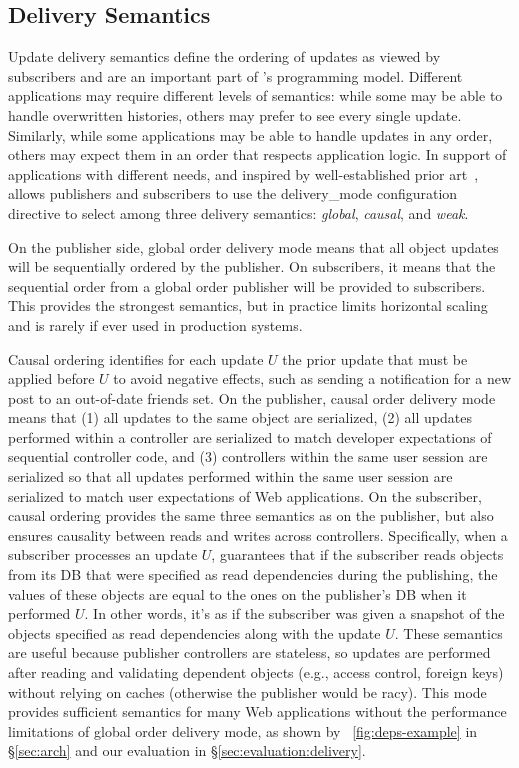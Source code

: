 \subsection{\synapse Delivery Semantics}
\label{sec:semantics}
Update delivery semantics define the ordering of updates as viewed by subscribers and are an important part of \synapse's
programming model. Different applications may 
require different levels of semantics:  while some may be able to handle overwritten histories,
others may prefer to see every single update.  Similarly, while some
applications may be able to  handle updates in any order, others may expect them in an
order that respects application logic. In support of applications with
different needs, and inspired by well-established prior
art~\cite{Birman:1991:LCA:128738.128742}, \synapse allows
publishers and subscribers to use the {\code delivery\_mode} configuration directive
to select among three delivery semantics: {\em global}, {\em causal},
and {\em weak}. 

On the publisher side, global order delivery mode means that all object
updates will be sequentially ordered by the publisher.  On
subscribers, it means that the sequential order from a global order
publisher will be provided to subscribers.  This provides the
strongest semantics, but in practice limits horizontal scaling and is
rarely if ever used in production systems.  

Causal ordering identifies for each update $U$ the prior update that
must be applied before $U$ to avoid negative effects, such as sending a
notification for a new post to an out-of-date friends set.
On the publisher, causal order delivery mode means that (1) all 
updates to the same object are serialized, (2) all updates performed
within a controller are serialized to match developer expectations of
sequential controller code, and (3) controllers within the same
user session are serialized so that all updates performed within the
same user session are serialized to match user expectations of Web
applications.
On the subscriber, causal ordering provides the same three semantics as on the
publisher, but also ensures causality between
reads and writes across controllers. 
Specifically, when a subscriber processes an update $U$, \synapse guarantees
that if the subscriber reads objects from its DB that were specified as read dependencies
during the publishing, the values of these objects are equal
to the ones on the publisher's DB when it performed $U$.
In other words, it's as if the subscriber was given a snapshot of the objects
specified as read dependencies along with the update $U$.
These semantics are useful because publisher controllers are stateless, so
updates are performed after reading and validating dependent objects (e.g.,
access control, foreign keys) without relying on caches (otherwise the publisher
would be racy).
This mode provides sufficient semantics for many Web applications
without the performance limitations of global order delivery mode, as shown by 
\F~\ref{fig:deps-example} in \S\ref{sec:arch} and our evaluation
in \S\ref{sec:evaluation:delivery}. 


